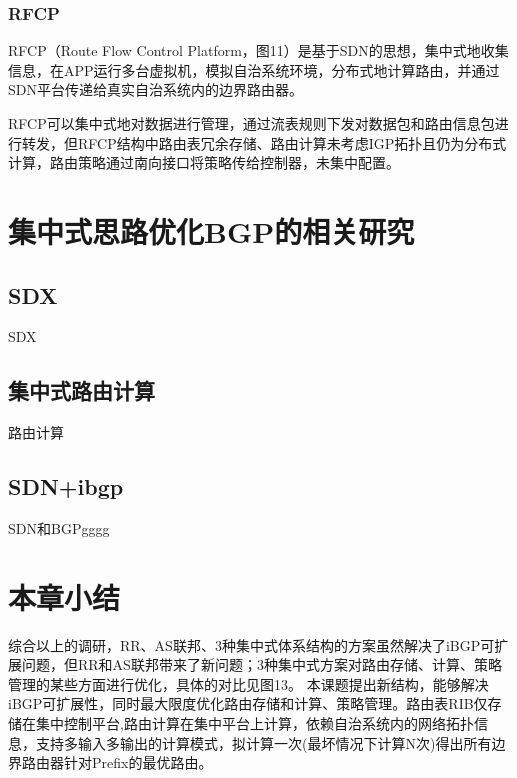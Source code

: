 \subsubsection{RFCP}
RFCP（Route Flow Control Platform，图11）是基于SDN的思想，集中式地收集信息，在APP运行多台虚拟机，模拟自治系统环境，分布式地计算路由，并通过SDN平台传递给真实自治系统内的边界路由器。

RFCP可以集中式地对数据进行管理，通过流表规则下发对数据包和路由信息包进行转发，但RFCP结构中路由表冗余存储、路由计算未考虑IGP拓扑且仍为分布式计算，路由策略通过南向接口将策略传给控制器，未集中配置。

\section{集中式思路优化BGP的相关研究}

\subsection{SDX}
SDX

\subsection{集中式路由计算}
路由计算

\subsection{SDN+ibgp}

SDN和BGPgggg\cite{conf/cfi/2014}


\section{本章小结}

综合以上的调研，RR、AS联邦、3种集中式体系结构的方案虽然解决了iBGP可扩展问题，但RR和AS联邦带来了新问题；3种集中式方案对路由存储、计算、策略管理的某些方面进行优化，具体的对比见图13。
本课题提出新结构，能够解决iBGP可扩展性，同时最大限度优化路由存储和计算、策略管理。路由表RIB仅存储在集中控制平台,路由计算在集中平台上计算，依赖自治系统内的网络拓扑信息，支持多输入多输出的计算模式，拟计算一次(最坏情况下计算N次)得出所有边界路由器针对Prefix的最优路由。
